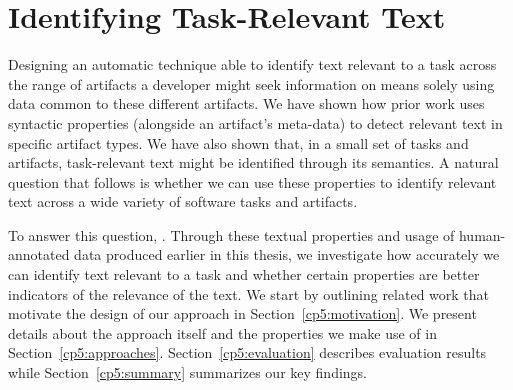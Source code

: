 \setcounter{chapter}{4}
\setcounter{rq}{1}


\chapter{Identifying Task-Relevant Text}
\label{ch:identifying}



Designing an automatic technique able to identify text relevant to a task across the range of artifacts a developer might seek information on means solely using data common to these different artifacts.
We have shown how  prior work uses syntactic properties (alongside an artifact's meta-data)
to detect relevant text in specific artifact types.
We have also shown that, in a small set of tasks and artifacts, task-relevant text might be identified through its semantics.
A natural question that follows is whether we can use these properties to identify relevant text across a wide variety of software tasks and artifacts.




To answer this question, .
Through these textual properties and usage of human-annotated data produced earlier in this thesis, we 
investigate how accurately we can identify text relevant to a task and whether certain properties are better indicators of the relevance of the text.
We start by outlining related work that motivate the design of our approach in Section~\ref{cp5:motivation}.
We present details about the approach itself and the properties we make use of in Section~\ref{cp5:approaches}.
Section~\ref{cp5:evaluation} describes evaluation results while
Section~\ref{cp5:summary} summarizes our key findings.










